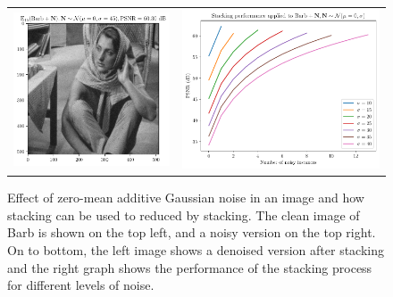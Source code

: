 \documentclass{article}
\begin{document}
\begin{enumerate}
\begin{figure}
{\begin{tabular}{cc}
        \includegraphics{denoised_0MAGN_barb} & \includegraphics{PSNR_0MAGN_barb}
      \end{tabular}
    }
    \caption{Effect of zero-mean additive Gaussian noise in an image
      and how stacking can be used to reduced by stacking. The clean
      image of Barb is shown on the top left, and a noisy version on
      the top right. On to bottom, the left image shows a denoised
      version after stacking and the right graph shows the performance
      of the stacking process for different levels of
      noise.\label{fig:0MAGN}}
  \end{figure}

\end{enumerate}
\end{document}
